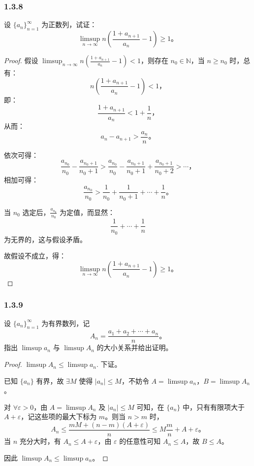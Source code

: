 \documentclass[12pt]{ctexart}
\begin{document}
\subsubsection*{1.3.8}
设 $\{a_n\}_{n=1}^\infty$ 为正数列，试证：
\[
\limsup_{n \to \infty} n \left( \frac{1 + a_{n+1}}{a_n} - 1 \right) \geq 1。
\]
\begin{proof}
假设 $\limsup_{n \to \infty} n \left( \frac{1 + a_{n+1}}{a_n} - 1 \right) < 1$，则存在 $n_0 \in \mathbb{N}$，当 $n \geq n_0$ 时，总有：
\[
n \left( \frac{1 + a_{n+1}}{a_n} - 1 \right) < 1，
\]
即：
\[
\frac{1 + a_{n+1}}{a_n} < 1 + \frac{1}{n}，
\]
从而：
\[
a_n - a_{n+1} > \frac{a_n}{n}。
\]

依次可得：
\[
\frac{a_{n_0}}{n_0} - \frac{a_{n_0+1}}{n_0+1} > \frac{a_{n_0}}{n_0} - \frac{a_{n_0+1}}{n_0+1} + \frac{a_{n_0+1}}{n_0+2} > \cdots，
\]
相加可得：
\[
\frac{a_{n_0}}{n_0} > \frac{1}{n_0} + \frac{1}{n_0+1} + \cdots + \frac{1}{n}。
\]

当 $n_0$ 选定后，$\frac{a_{n_0}}{n_0}$ 为定值，而显然：
\[
\frac{1}{n_0} + \cdots + \frac{1}{n}
\]
为无界的，这与假设矛盾。

故假设不成立，得：
\[
\limsup_{n \to \infty} n \left( \frac{1 + a_{n+1}}{a_n} - 1 \right) \geq 1。
\]
\end{proof}

\subsubsection*{1.3.9}
设 $\{a_n\}_{n=1}^\infty$ 为有界数列，记
\[
A_n = \frac{a_1 + a_2 + \cdots + a_n}{n}。
\]
指出 $\limsup a_n$ 与 $\limsup A_n$ 的大小关系并给出证明。

\begin{proof}
$\limsup A_n \leq \limsup a_n$. 下证。

已知 $\{a_n\}$ 有界，故 $\exists M$ 使得 $\lvert a_n \rvert \leq M$，不妨令 $A = \limsup a_n$，$B = \limsup A_n$。

对 $\forall \varepsilon > 0$，由 $A = \limsup A_n$ 及 $\lvert a_n \rvert \leq M$ 可知，在 $\{a_n\}$ 中，只有有限项大于 $A + \varepsilon$，记这些项的最大下标为 $m$。则当 $n > m$ 时，
\[
A_n \leq \frac{mM + (n-m)(A + \varepsilon)}{n} \leq M \frac{m}{n} + A + \varepsilon。
\]
当 $n$ 充分大时，有 $A_n \leq A + \varepsilon$，由 $\varepsilon$ 的任意性可知 $A_n \leq A$，故 $B \leq A$。

因此 $\limsup A_n \leq \limsup a_n$。
\end{proof}
\end{document}
